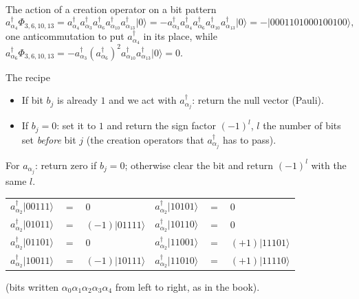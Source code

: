\documentclass[aspectratio=169,10pt]{beamer}
\newcommand{\ket}[1]{\vert #1\rangle}
\begin{document}
\begin{frame}{The action of a creation operator on a bit pattern}
  \small\vspace{-0.2em}
  \[
    a^{\dagger}_{\alpha_4}\Phi_{3,6,10,13}
    =a^{\dagger}_{\alpha_4}a_{\alpha_3}^{\dagger}a_{\alpha_6}^{\dagger}a_{\alpha_{10}}^{\dagger}a_{\alpha_{13}}^{\dagger}\ket{0}
    =-a_{\alpha_3}^{\dagger}a^{\dagger}_{\alpha_4}a_{\alpha_6}^{\dagger}a_{\alpha_{10}}^{\dagger}a_{\alpha_{13}}^{\dagger}\ket{0}
    =-\ket{0001101000100100},
  \]
  one anticommutation to put $a_{\alpha_4}^{\dagger}$ in its place, while
  $a^{\dagger}_{\alpha_6}\Phi_{3,6,10,13}=-a_{\alpha_3}^{\dagger}(a_{\alpha_6}^{\dagger})^2a_{\alpha_{10}}^{\dagger}a_{\alpha_{13}}^{\dagger}\ket{0}=0$.
  \begin{block}{The recipe}
    \begin{itemize}
      \item If bit $b_j$ is already $1$ and we act with $a^{\dagger}_{\alpha_j}$: return the null vector (Pauli).
      \item If $b_j=0$: set it to $1$ and return the sign factor $(-1)^{l}$, $l$ the number of bits set \emph{before} bit $j$ (the creation operators that $a^{\dagger}_{\alpha_j}$ has to pass).
    \end{itemize}
    For $a_{\alpha_j}$: return zero if $b_j=0$; otherwise clear the bit and return $(-1)^{l}$ with the same $l$.
  \end{block}
  \begin{center}\footnotesize
  \renewcommand{\arraystretch}{1.0}
  \begin{tabular}{lll@{\qquad}lll}
    $a^{\dagger}_{\alpha_2}\ket{00111}$ & $=$ & $0$ &
    $a^{\dagger}_{\alpha_2}\ket{10101}$ & $=$ & $0$\\
    $a^{\dagger}_{\alpha_2}\ket{01011}$ & $=$ & $(-1)\ket{01111}$ &
    $a^{\dagger}_{\alpha_2}\ket{10110}$ & $=$ & $0$\\
    $a^{\dagger}_{\alpha_2}\ket{01101}$ & $=$ & $0$ &
    $a^{\dagger}_{\alpha_2}\ket{11001}$ & $=$ & $(+1)\ket{11101}$\\
    $a^{\dagger}_{\alpha_2}\ket{10011}$ & $=$ & $(-1)\ket{10111}$ &
    $a^{\dagger}_{\alpha_2}\ket{11010}$ & $=$ & $(+1)\ket{11110}$\\
  \end{tabular}
  \end{center}
  (bits written $\alpha_0\alpha_1\alpha_2\alpha_3\alpha_4$ from left to right, as in the book).
\end{frame}
\end{document}
